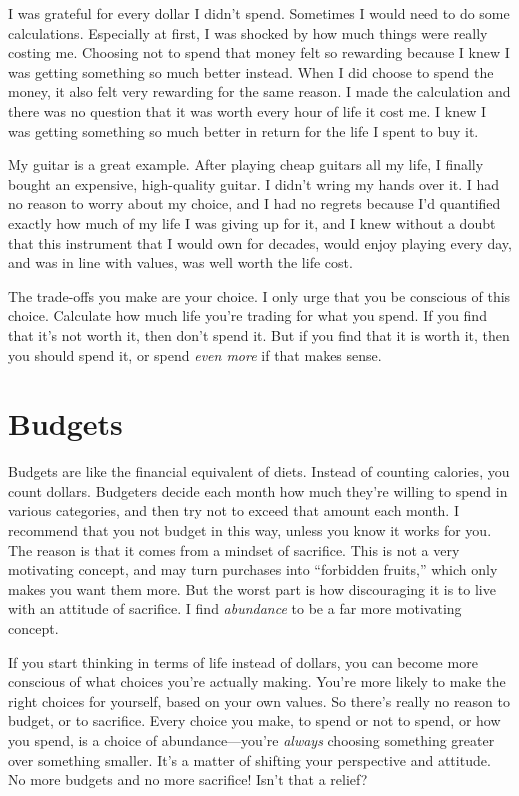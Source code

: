 I was grateful for every dollar I didn't spend. Sometimes I would need to do some calculations. Especially at first, I was shocked by how much things were really costing me. Choosing not to spend that money felt so rewarding because I knew I was getting something so much better instead. When I did choose to spend the money, it also felt very rewarding for the same reason. I made the calculation and there was no question that it was worth every hour of life it cost me. I knew I was getting something so much better in return for the life I spent to buy it.

My guitar is a great example. After playing cheap guitars all my life, I finally bought an expensive, high-quality guitar. I didn't wring my hands over it. I had no reason to worry about my choice, and I had no regrets because I'd quantified exactly how much of my life I was giving up for it, and I knew without a doubt that this instrument that I would own for decades, would enjoy playing every day, and was in line with values, was well worth the life cost.

The trade-offs you make are your choice. I only urge that you be conscious of this choice. Calculate how much life you're trading for what you spend. If you find that it's not worth it, then don't spend it. But if you find that it is worth it, then you should spend it, or spend \emph{even more} if that makes sense.

\section{Budgets}
Budgets are like the financial equivalent of diets. Instead of counting calories, you count dollars. Budgeters decide each month how much they're willing to spend in various categories, and then try not to exceed that amount each month. I recommend that you not budget in this way, unless you know it works for you. The reason is that it comes from a mindset of sacrifice. This is not a very motivating concept, and may turn purchases into ``forbidden fruits,'' which only makes you want them more. But the worst part is how discouraging it is to live with an attitude of sacrifice. I find \emph{abundance} to be a far more motivating concept.

If you start thinking in terms of life instead of dollars, you can become more conscious of what choices you're actually making. You're more likely to make the right choices for yourself, based on your own values. So there's really no reason to budget, or to sacrifice. Every choice you make, to spend or not to spend, or how you spend, is a choice of abundance---you're \emph{always} choosing something greater over something smaller. It's a matter of shifting your perspective and attitude. No more budgets and no more sacrifice! Isn't that a relief?

